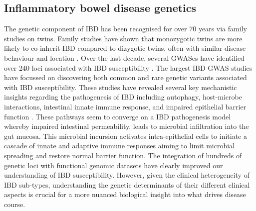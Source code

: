 \subsection{Inflammatory bowel disease genetics}
The genetic component of IBD has been recognised for over 70 years via family studies on twins. Family studies have shown that monozygotic twins are more likely to co-inherit IBD compared to dizygotic twins, often with similar disease behaviour and location \cite{Ng2012-mf}. Over the last decade, several GWASes have identified over 240 loci associated with IBD susceptibility \cite{Jostins2012-ig,De_Lange2017-re,Liu2015-bx,Luo2017-kx}. The largest IBD GWAS studies have focussed on discovering both common and rare genetic variants associated with IBD susceptibility. These studies have revealed several key mechanistic insights regarding the pathogenesis of IBD including autophagy, host-microbe interactions, intestinal innate immune response, and impaired epithelial barrier function \cite{Khor2011-td,Jostins2012-ig}. These pathways seem to converge on a IBD pathogenesis model whereby impaired intestinal permeability, leads to microbial infiltration into the gut mucosa. This microbial incursion activates intra-epithelial cells to initiate a cascade of innate and adaptive immune responses aiming to limit microbial spreading and restore normal barrier function. The integration of hundreds of genetic loci with functional genomic datasets have clearly improved our understanding of IBD susceptibility. However, given the clinical heterogeneity of IBD sub-types, understanding the genetic determinants of their different clinical aspects is crucial for a more nuanced biological insight into what drives disease course.\\


